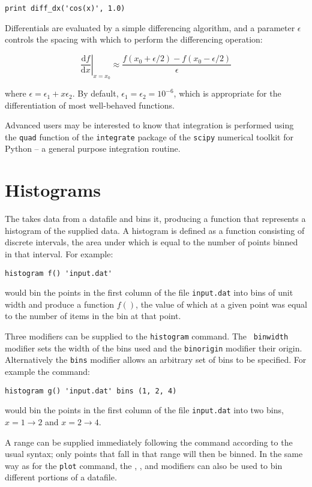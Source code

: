 \begin{verbatim}
print diff_dx('cos(x)', 1.0)
\end{verbatim}

Differentials are evaluated by a simple differencing algorithm, and a parameter
$\epsilon$ controls the spacing with which to perform the differencing
operation:

\begin{displaymath}
\left.\frac{\mathrm{d}f}{\mathrm{d}x}\right|_{x=x_0} \approx \frac{f(x_0+\epsilon/2) - f(x_0-\epsilon/2)}{\epsilon}
\end{displaymath}

\noindent where $\epsilon = \epsilon_1 + x \epsilon_2$. By default, $\epsilon_1
= \epsilon_2 = 10^{-6}$, which is appropriate for the differentiation of most
well-behaved functions.

Advanced users may be interested to know that integration is performed using
the {\tt quad} function of the {\tt integrate} package of the
{\tt scipy} numerical toolkit for Python -- a general purpose integration
routine.

\section{Histograms}

The  takes data from a datafile and bins it, producing a
function that represents a histogram of the supplied data.  A histogram is
defined as a function consisting of discrete intervals, the area under which is
equal to the number of points binned in that interval.  For example:

\begin{verbatim}
histogram f() 'input.dat'
\end{verbatim}

\noindent would bin the points in the first column of the file {\tt input.dat}
into bins of unit width and produce a function $f()$, the value of which at a
given point was equal to the number of items in the bin at that point.

Three modifiers can be supplied to the {\tt histogram} command. The {\tt
binwidth} modifier sets the width of the bins used and the {\tt binorigin}
modifier their origin. Alternatively the {\tt bins} modifier allows an
arbitrary set of bins to be specified. For example the command:

\begin{verbatim}
histogram g() 'input.dat' bins (1, 2, 4)
\end{verbatim}

\noindent would bin the points in the first column of the file {\tt input.dat}
into two bins, $x=1\to 2$ and $x=2\to 4$.

A range can be supplied immediately following the command according to the
usual syntax; only points that fall in that range will then be binned.  In the
same way as for the {\tt plot} command, the , ,
 and  modifiers can also be used to bin
different portions of a datafile.
